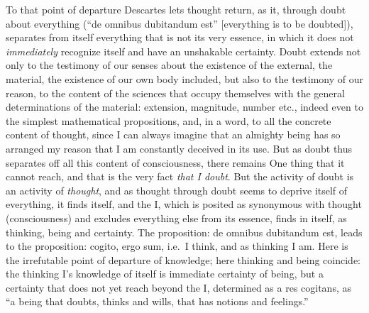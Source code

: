 To that point of departure Descartes lets thought return, as it, through doubt about everything (``de omnibus dubitandum est'' [everything is to be doubted]), separates from itself everything that is not its very essence, in which it does not \emph{immediately} recognize itself and have an unshakable certainty. Doubt extends not only to the testimony of our senses about the existence of the external, the material, the existence of our own body included, but also to the testimony of our reason, to the content of the sciences that occupy themselves with the general determinations of the material: extension, magnitude, number etc., indeed even to the simplest mathematical propositions, and, in a word, to all the concrete content of thought, since I can always imagine that an almighty being has
so arranged my reason that I am constantly deceived in its use. But as doubt thus separates off all this content of consciousness, there remains One thing that it cannot reach, and that is the very fact \emph{that I doubt}. But the activity of doubt is an activity of \emph{thought}, and as thought through doubt seems to deprive itself of everything, it finds itself, and the I, which is posited as synonymous with thought (consciousness) and excludes everything else from its essence, finds in itself, as thinking, being and certainty. The proposition: de omnibus dubitandum est, leads to the proposition: cogito, ergo sum, i.e.\ I think, and as thinking I am. Here is the irrefutable point of departure of knowledge; here thinking and being coincide: the thinking I's knowledge of itself is immediate certainty of being, but a certainty that does not yet reach beyond the I, determined as a res cogitans, as ``a being that doubts, thinks and wills, that has notions and feelings.''

